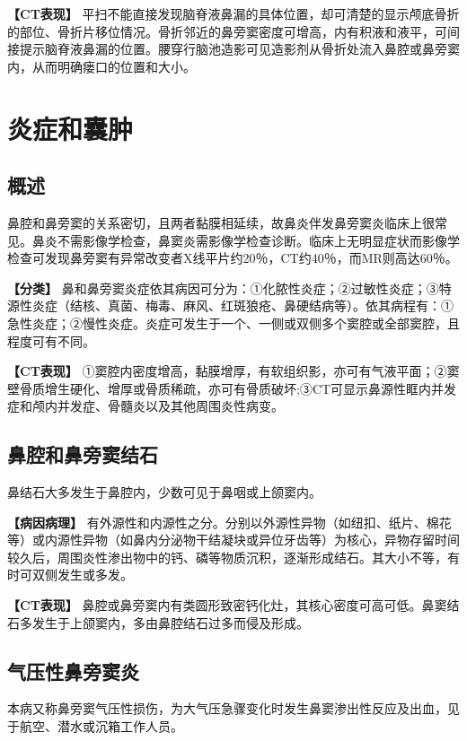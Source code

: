 \textbf{【CT表现】}
平扫不能直接发现脑脊液鼻漏的具体位置，却可清楚的显示颅底骨折的部位、骨折片移位情况。骨折邻近的鼻旁窦密度可增高，内有积液和液平，可间接提示脑脊液鼻漏的位置。腰穿行脑池造影可见造影剂从骨折处流入鼻腔或鼻旁窦内，从而明确瘘口的位置和大小。

\section{炎症和囊肿}

\subsection{概述}

鼻腔和鼻旁窦的关系密切，且两者黏膜相延续，故鼻炎伴发鼻旁窦炎临床上很常见。鼻炎不需影像学检查，鼻窦炎需影像学检查诊断。临床上无明显症状而影像学检查可发现鼻旁窦有异常改变者X线平片约20％，CT约40％，而MR则高达60％。

\textbf{【分类】}
鼻和鼻旁窦炎症依其病因可分为：①化脓性炎症；②过敏性炎症；③特源性炎症（结核、真菌、梅毒、麻风、红斑狼疮、鼻硬结病等）。依其病程有：①急性炎症；②慢性炎症。炎症可发生于一个、一侧或双侧多个窦腔或全部窦腔，且程度可有不同。

\textbf{【CT表现】}
①窦腔内密度增高，黏膜增厚，有软组织影，亦可有气液平面；②窦壁骨质增生硬化、增厚或骨质稀疏，亦可有骨质破坏;③CT可显示鼻源性眶内并发症和颅内并发症、骨髓炎以及其他周围炎性病变。

\subsection{鼻腔和鼻旁窦结石}

鼻结石大多发生于鼻腔内，少数可见于鼻咽或上颌窦内。

\textbf{【病因病理】}
有外源性和内源性之分。分别以外源性异物（如纽扣、纸片、棉花等）或内源性异物（如鼻内分泌物干结凝块或异位牙齿等）为核心，异物存留时间较久后，周围炎性渗出物中的钙、磷等物质沉积，逐渐形成结石。其大小不等，有时可双侧发生或多发。

\textbf{【CT表现】}
鼻腔或鼻旁窦内有类圆形致密钙化灶，其核心密度可高可低。鼻窦结石多发生于上颌窦内，多由鼻腔结石过多而侵及形成。

\subsection{气压性鼻旁窦炎}

本病又称鼻旁窦气压性损伤，为大气压急骤变化时发生鼻窦渗出性反应及出血，见于航空、潜水或沉箱工作人员。

